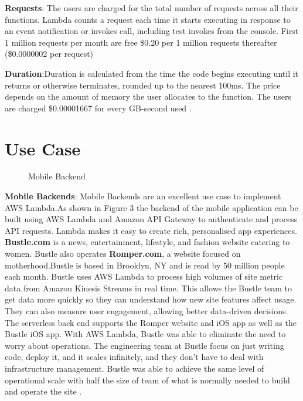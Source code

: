 \documentclass[9pt,twocolumn,twoside]{styles/osajnl}
\begin{document}
\textbf{Requests}: The users are charged for the total number of requests across all their functions. Lambda counts a request each time it starts executing in response to an event notification or invokes call, including test invokes from the console. First 1 million requests per month are free
\$0.20 per 1 million requests thereafter (\$0.0000002 per request)

\textbf{Duration}:Duration is calculated from the time the code begins executing until it returns or otherwise terminates, rounded up to the nearest 100ms. The price depends on the amount of memory the user allocates to the function. The users are charged \$0.00001667 for every GB-second used \cite{www-AWSLambdaPricing}.

\section{Use Case}



\renewcommand{\labelitemi}{\scriptsize$\bullet$} 
\begin{figure}[H]
\centering
\graphicspath{ {images/} }
\caption{Mobile Backend} \cite{www-AWSLambda}
\label{fig:false-color}
\end{figure}

\textbf{Mobile Backends}: Mobile Backends are an excellent use case to implement AWS Lambda.As shown in Figure 3 the backend of the mobile application can be built using AWS Lambda and Amazon API Gateway to authenticate and process API requests. Lambda makes it easy to create rich, personalised app experiences.
\textbf{Bustle.com} is a news, entertainment, lifestyle, and fashion website catering to women. Bustle also operates \textbf{Romper.com}, a website focused on motherhood.Bustle is based in Brooklyn, NY and is read by 50 million people each month. Bustle uses AWS Lambda to process high volumes of site metric data from Amazon Kinesis Streams \cite{www-AWSKinesis} in real time. This allows the Bustle team to get data more quickly so they can understand how new site features affect usage. They can also measure user engagement, allowing better data-driven decisions. The serverless back end supports the Romper website and iOS app as well as the Bustle iOS app. With AWS Lambda, Bustle was able to eliminate the need to worry about operations. The engineering team at Bustle focus on just writing code, deploy it, and it scales infinitely, and they don't have to deal with infrastructure management. Bustle was able to achieve the same level of operational scale with half the size of team of what is normally needed to build and operate the site  \cite{www-AWSLambdaBustle}.
\end{document}
